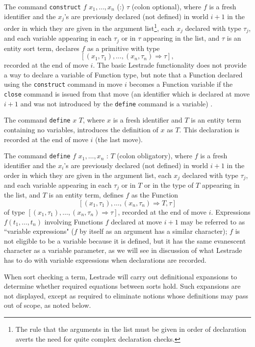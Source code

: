 \documentclass[submission,copyright,creativecommons]{eptcs}
\begin{document}
The command {\tt construct} $f$ $x_1, \ldots,x_n$ (:) $\tau$ (colon optional), where $f$ is a fresh identifier and the $x_j$'s are previously declared (not defined) in world $i+1$ in the order in which they are given in the argument list\footnote{The rule that the arguments in the list must be given in order of declaration averts the need for quite complex declaration checks.}, each $x_j$ declared with type $\tau_j$, and each variable appearing in each $\tau_j$ or in $\tau$ appearing in the list, and $\tau$ is an entity sort term, declares $f$ as a primitive with type
$$[(x_1,\tau_1),\ldots,(x_n,\tau_n) \Rightarrow \tau],$$ recorded at the end of move $i$.  The basic Lestrade functionality does not provide a way to declare a variable of Function type, but note that a Function declared using the {\tt construct} command in move $i$ becomes a Function variable if the {\tt close} command is issued from that move (an identifier which is declared at move $i+1$ and was not introduced by the {\tt define} command is a variable) .

The command {\tt define} $x$ $T$, where $x$ is a fresh identifier and $T$ is an entity term containing no variables, introduces the definition of $x$ as $T$.  This declaration is recorded at the end of move $i$ (the last move).

The command {\tt define} $f$ $x_1, \ldots,x_n$ : $T$ (colon obligatory), where $f$ is a fresh identifier and the $x_i$'s are previously declared (not defined) in world $i+1$ in the order in which they are given in the argument list, each $x_j$ declared with type $\tau_j$, and each variable appearing in each $\tau_j$ or in $T$ or in the type of $T$ appearing in the list, and $T$ is an entity term, defines $f$ as the Function $$[(x_1,\tau_1),\ldots,(x_n,\tau_n) \Rightarrow T,\tau]$$ of type
$[(x_1,\tau_1),\ldots,(x_n,\tau_n) \Rightarrow \tau]$, recorded at the end of move $i$.    Expressions $f(t_1,\ldots,t_n)$ involving Functions $f$ declared at move $i+1$ may be referred to as ``variable expressions" ($f$ by itself as an argument has  a similar character);  $f$ is not eligible to be a variable because it is defined, but it has the same evanescent character as a variable parameter, as we will see in discussion of what Lestrade has to do with variable expressions when declarations are recorded.

When sort checking a term, Lestrade will carry out definitional expansions to determine whether required equations between sorts hold.  Such expansions are not displayed, except as required to eliminate notions whose definitions may pass out of scope, as noted below.
\end{document}
